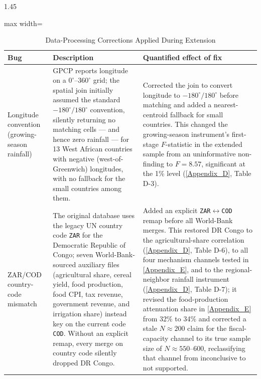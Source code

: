 \documentclass[12pt]{article}
\begin{document}
\begin{bibunit}[jpe]
\begin{spacing}{1.45}
\begin{table}[H]
\centering
\begin{adjustbox}{max width=\textwidth}
\begin{threeparttable}
\caption{Data-Processing Corrections Applied During Extension}
\label{tab:B2}
\begin{tabular}{p{3.4cm}p{5.7cm}p{4.9cm}}
\toprule
Bug & Description & Quantified effect of fix \\
\midrule
Longitude convention (growing-season rainfall) & GPCP reports longitude on a $0^{\circ}$--$360^{\circ}$ grid; the spatial join initially assumed the standard $-180^{\circ}/180^{\circ}$ convention, silently returning no matching cells --- and hence zero rainfall --- for 13 West African countries with negative (west-of-Greenwich) longitudes, with no fallback for the small countries among them. &
Corrected the join to convert longitude to $-180^{\circ}/180^{\circ}$ before matching and added a nearest-centroid fallback for small countries. This changed the growing-season instrument's first-stage $F$-statistic in the extended sample from an uninformative non-finding to $F=8.57$, significant at the 1\% level (\ref{Appendix_D}, Table D-3). \\
\addlinespace
ZAR/COD country-code mismatch & The original database uses the legacy UN country code \texttt{ZAR} for the Democratic Republic of Congo; seven World-Bank-sourced auxiliary files (agricultural share, cereal yield, food production, food CPI, tax revenue, government revenue, and irrigation share) instead key on the current code \texttt{COD}. Without an explicit remap, every merge on country code silently dropped DR Congo. &
Added an explicit \texttt{ZAR}$\leftrightarrow$\texttt{COD} remap before all World-Bank merges. This restored DR Congo to the agricultural-share correlation (\ref{Appendix_D}, Table D-6), to all four mechanism channels tested in \ref{Appendix_E}, and to the regional-neighbor rainfall instrument (\ref{Appendix_D}, Table D-7); it revised the food-production attenuation share in \ref{Appendix_E} from 32\% to 34\% and corrected a stale $N\approx200$ claim for the fiscal-capacity channel to its true sample size of $N\approx550$--600, reclassifying that channel from inconclusive to not supported. \\
\bottomrule
\end{tabular}
\end{threeparttable}
\end{adjustbox}
\end{table}


\end{spacing}
\end{bibunit}
\end{document}
